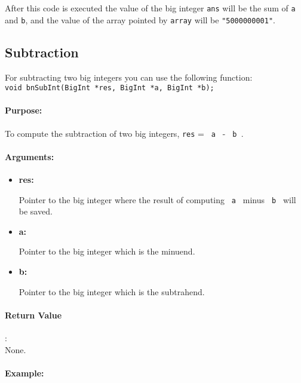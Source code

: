 \documentclass{book}
\begin{document}
After this code is executed the value of the big integer \verb+ans+ will be the sum of \verb+a+ and \verb+b+, and the value of the array pointed by \verb+array+ will be \verb+"5000000001"+.

\subsection{Subtraction}

For subtracting two big integers you can use the following function:\\

\verb+void bnSubInt(BigInt *res, BigInt *a, BigInt *b);+\\

\paragraph{Purpose:} 

To compute the subtraction of two big integers, \verb+res+ = \verb+ a + - \verb+ b +.

\paragraph{Arguments:}

\begin{itemize}
\item{\bf res:}

Pointer to the big integer where the result of computing \verb+ a + minus  \verb+ b + will be saved.

\item {\bf a:}

Pointer to the big integer which is the minuend. 

\item {\bf b:}

Pointer to the big integer which is the subtrahend.

\end{itemize}

\paragraph{Return Value}:\\

None.

\paragraph{Example:}
\end{document}
